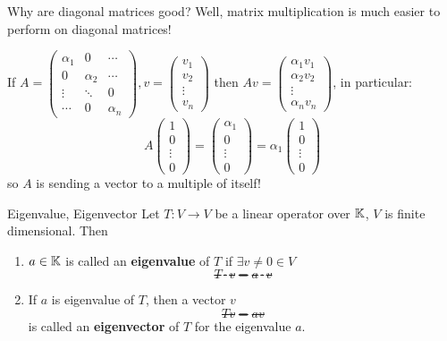 \begin{remark}
    Why are diagonal matrices good? Well, matrix multiplication is much easier to perform on diagonal matrices!

    If \(A = \begin{pmatrix}
        \alpha_1 & 0        & \cdots   \\
        0        & \alpha_2 & \cdots   \\
        \vdots   & \ddots   & 0        \\
        \cdots   & 0        & \alpha_n
    \end{pmatrix}, v = \begin{pmatrix}
        v_1    \\
        v_2    \\
        \vdots \\
        v_n
    \end{pmatrix} \) then \(Av = \begin{pmatrix}
        \alpha_1 v_1 \\
        \alpha_2 v_2 \\
        \vdots       \\
        \alpha_n v_n
    \end{pmatrix}\), in particular: \[
        A \begin{pmatrix}
            1      \\
            0      \\
            \vdots \\
            0
        \end{pmatrix} = \begin{pmatrix}
            \alpha_1 \\
            0        \\
            \vdots   \\
            0
        \end{pmatrix} = \alpha_1 \begin{pmatrix}
            1      \\
            0      \\
            \vdots \\
            0
        \end{pmatrix}
    \]
    so \(A\) is sending a vector to a multiple of itself!
\end{remark}

\begin{definition} {Eigenvalue, Eigenvector}
    Let \(T: V \to V\) be a linear operator over \(\mathbb{K}\), \(V\) is finite dimensional. Then \begin{enumerate}
        \item \(a \in \mathbb{K}\) is called an \textbf{eigenvalue} of \(T\) if \(\exists v \neq 0 \in V\) \st \[
                  T\cdot v = a \cdot v
              \]
        \item If \(a\) is eigenvalue of \(T\), then a vector \(v\) \st \[Tv = av\] is called an \textbf{eigenvector} of \(T\) for the eigenvalue \(a\).
    \end{enumerate}
\end{definition}


